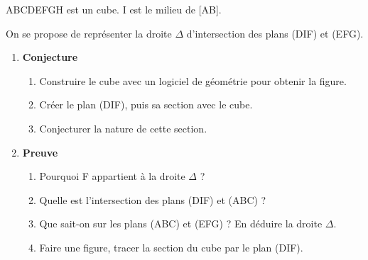 

ABCDEFGH est un cube. I est le milieu de [AB]. 

On se propose de représenter la droite $\Delta$ d'intersection des plans (DIF) et (EFG).
\begin{enumerate}
\item \textbf{Conjecture} 
\begin{enumerate}
\item  Construire le cube avec un logiciel de géométrie pour obtenir la figure.
\item  Créer le plan (DIF), puis sa section avec le cube. 
\item Conjecturer la nature de cette section. 
\end{enumerate}
\item \textbf{Preuve}
\begin{enumerate}
\item Pourquoi F appartient à la droite $\Delta$  ?
\item Quelle est l'intersection des plans (DIF) et (ABC) ?
\item Que sait-on sur les plans (ABC) et (EFG) ? En déduire la droite $\Delta$.
\item Faire une figure, tracer la section du cube par le plan (DIF).
\end{enumerate}
\end{enumerate}